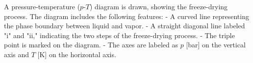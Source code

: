 A pressure-temperature (\(p\)-\(T\)) diagram is drawn, showing the freeze-drying process. The diagram includes the following features:  
- A curved line representing the phase boundary between liquid and vapor.  
- A straight diagonal line labeled "i" and "ii," indicating the two steps of the freeze-drying process.  
- The triple point is marked on the diagram.  
- The axes are labeled as \(p\) [bar] on the vertical axis and \(T\) [K] on the horizontal axis.